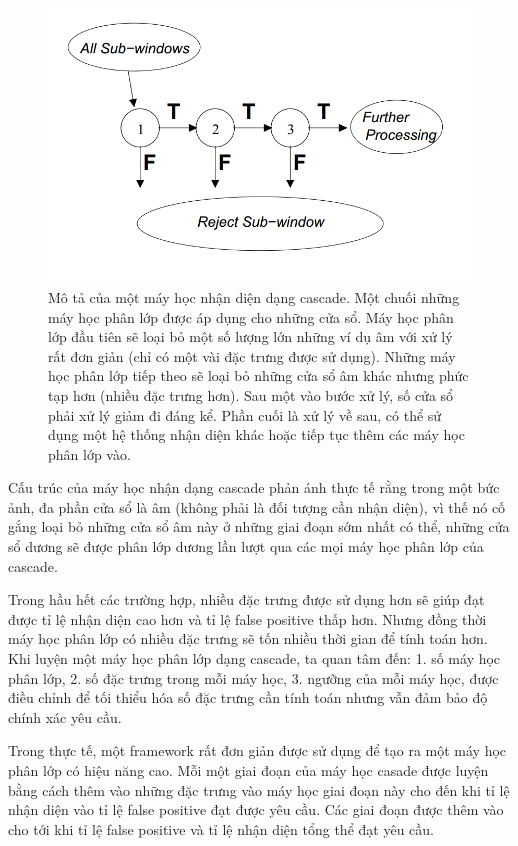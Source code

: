 \documentclass[14pt, oneside, a4paper, openany]{scrartcl}
\begin{document}
\begin{figure}[!h]
	\centering
	\includegraphics[scale=0.5]{figures/cascadeDetection.png} 
	\caption[Mô tả của một máy học nhận diện dạng cascade]{Mô tả của một máy học nhận diện dạng cascade. Một chuối những máy học phân lớp được áp dụng cho những cửa sổ. Máy học phân lớp đầu tiên sẽ loại bỏ một số lượng lớn những ví dụ âm với xử lý rất đơn giản (chỉ có một vài đặc trưng được sử dụng). Những máy học phân lớp tiếp theo sẽ loại bỏ những cửa sổ âm khác nhưng phức tạp hơn (nhiều đặc trưng hơn). Sau một vào bước xử lý, số cửa sổ phải xử lý giảm đi đáng kể. Phần cuối là xử lý về sau, có thể sử dụng một hệ thống nhận diện khác hoặc tiếp tục thêm các máy học phân lớp vào.}
\end{figure}
Cấu trúc của máy học nhận dạng cascade phản ánh thực tế rằng trong một bức ảnh, đa phần cửa sổ là âm (không phải là đối tượng cần nhận diện), vì thế nó cố gắng loại bỏ những cửa sổ âm này ở những giai đoạn sớm nhất có thể, những cửa sổ dương sẽ được phân lớp dương lần lượt qua các mọi máy học phân lớp của cascade.

Trong hầu hết các trường hợp, nhiều đặc trưng được sử dụng hơn sẽ giúp đạt được tỉ lệ nhận diện cao hơn và tỉ lệ false positive thấp hơn. Nhưng đồng thời máy học phân lớp có nhiều đặc trưng sẽ tốn nhiều thời gian để tính toán hơn. Khi luyện một máy học phân lớp dạng cascade, ta quan tâm đến: 1. số máy học phân lớp, 2. số đặc trưng trong mỗi máy học, 3. ngưỡng của mỗi máy học, được điều chỉnh để tối thiểu hóa số đặc trưng cần tính toán nhưng vẫn đảm bảo độ chính xác yêu cầu.

Trong thực tế, một framework rất đơn giản được sử dụng để tạo ra một máy học phân lớp có hiệu năng cao.
Mỗi một giai đoạn của máy học casade được luyện bằng cách thêm vào những đặc trưng vào máy học giai đoạn này cho đến khi tỉ lệ nhận diện vào tỉ lệ false positive đạt được yêu cầu. Các giai đoạn được thêm vào cho tới khi tỉ lệ false positive và tỉ lệ nhận diện tổng thể đạt yêu cầu.
\end{document}
